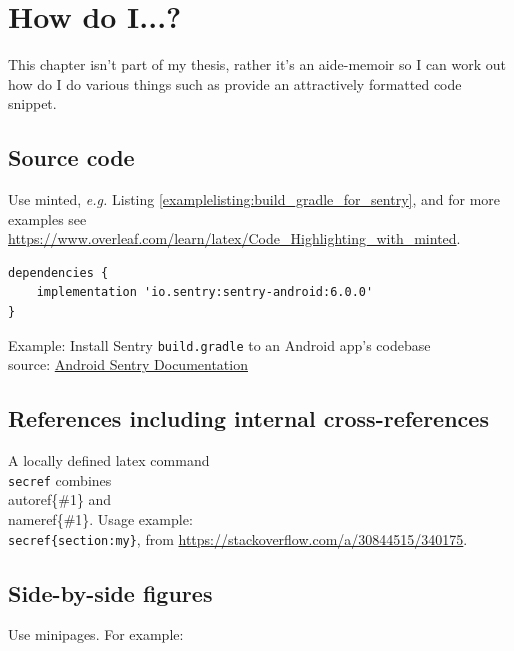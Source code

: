 \chapter{How do I...?}
This chapter isn't part of my thesis, rather it's an aide-memoir so I can work out how do I do various things such as provide an attractively formatted code snippet.

\section{Source code}
Use minted, \textit{e.g.} Listing \ref{examplelisting:build_gradle_for_sentry}, and for more examples see \url{https://www.overleaf.com/learn/latex/Code_Highlighting_with_minted}.

\begin{listing}
\begin{verbatim}
dependencies {
    implementation 'io.sentry:sentry-android:6.0.0'
}
\end{verbatim}
\caption{Example: Install Sentry \texttt{build.gradle} to an Android app's codebase\\source: \href{https://docs.sentry.io/platforms/android/}{Android Sentry Documentation}}
\label{examplelisting:build_gradle_for_sentry}
\end{listing}

\section{References including internal cross-references}
A locally defined latex command \texttt{\\secref{}} combines \\autoref\{\#1\} and \\nameref\{\#1\}. 
Usage example: \texttt{\\secref\{section:my\}}, from \url{https://stackoverflow.com/a/30844515/340175}.

\section{Side-by-side figures}
Use minipages. For example:


